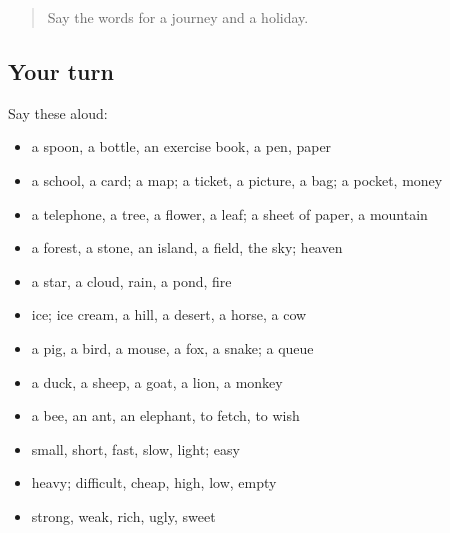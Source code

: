 \label{lesson:GE-R103-first-pass-nature-animals-and-describing-words}



\begin{quote}
Say the words for a journey and a holiday.
\end{quote}

\subsection*{Your turn}
Say these aloud:

\begin{itemize}
\raggedright
  \item a spoon, a bottle, an exercise book, a pen, paper
  \item a school, a card; a map; a ticket, a picture, a bag; a pocket, money
  \item a telephone, a tree, a flower, a leaf; a sheet of paper, a mountain
  \item a forest, a stone, an island, a field, the sky; heaven
  \item a star, a cloud, rain, a pond, fire
  \item ice; ice cream, a hill, a desert, a horse, a cow
  \item a pig, a bird, a mouse, a fox, a snake; a queue
  \item a duck, a sheep, a goat, a lion, a monkey
  \item a bee, an ant, an elephant, to fetch, to wish
  \item small, short, fast, slow, light; easy
  \item heavy; difficult, cheap, high, low, empty
  \item strong, weak, rich, ugly, sweet
\end{itemize}

